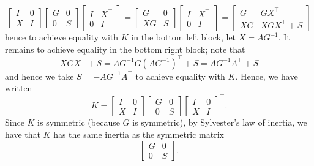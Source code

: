 \documentclass{../kin_math}
\begin{document}
\begin{questions}
\begin{solution}
\begin{equation*}
      \begin{bmatrix} I & 0 \\ X & I \end{bmatrix} \begin{bmatrix} G & 0 \\ 0 & S \end{bmatrix} \begin{bmatrix} I & X^\top \\ 0 & I \end{bmatrix} = \begin{bmatrix} G & 0 \\ XG & S \end{bmatrix} \begin{bmatrix} I & X^\top \\ 0 & I \end{bmatrix} = \begin{bmatrix} G & GX^\top \\ XG & XGX^\top + S \end{bmatrix}
    \end{equation*}
    hence to achieve equality with $K$ in the bottom left block, let $X = AG^{-1}$. It remains to achieve equality in the bottom right block; note that
    \begin{equation*}
      XGX^\top + S = AG^{-1} G (AG^{-1})^\top + S = AG^{-1}A^\top + S
    \end{equation*}
    and hence we take $S = -AG^{-1}A^\top$ to achieve equality with $K$. Hence, we have written
    \begin{equation*}
      K = \begin{bmatrix} I & 0 \\ X & I \end{bmatrix} \begin{bmatrix} G & 0 \\ 0 & S \end{bmatrix} \begin{bmatrix} I & 0 \\ X & I \end{bmatrix}^\top.
    \end{equation*}
    Since $K$ is symmetric (because $G$ is symmetric), by Sylvester's law of inertia, we have that $K$ has the same inertia as the symmetric matrix
    \begin{equation*}
      \begin{bmatrix}
        G & 0 \\ 0 & S
      \end{bmatrix}.
    \end{equation*}

\end{solution}
\end{questions}
\end{document}
